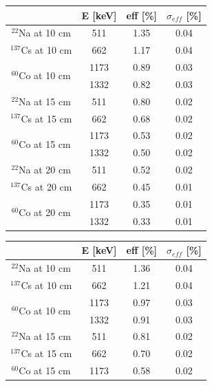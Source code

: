 \begin{table}[h]
    \begin{subtable}
        \centering
        \begin{tabular}{|c|c|c|c|}
        \hline
        & E [keV]  & eff [\%] &$\sigma_{eff}$ [\%]  \\
        \hline
        $^{22}$Na at 10 cm & 511 &1.35&0.04\\
        \hline
        $^{137}$Cs at 10 cm & 662 & 1.17 & 0.04\\
        \hline
        \multirow{2}{*}{$^{60}$Co at 10 cm}&1173 &0.89 & 0.03 \\ 
        &1332 &0.82 & 0.03 \\
        \hline
        $^{22}$Na at 15 cm & 511 &0.80&0.02\\
        \hline
        $^{137}$Cs at 15 cm & 662 & 0.68 & 0.02\\
        \hline
        \multirow{2}{*}{$^{60}$Co at 15 cm}&1173 &0.53 & 0.02 \\ 
        &1332 &0.50 & 0.02 \\
        \hline
        $^{22}$Na at 20 cm & 511 &0.52&0.02\\
        \hline
        $^{137}$Cs at 20 cm & 662 & 0.45 & 0.01\\
        \hline
        \multirow{2}{*}{$^{60}$Co at 20 cm}&1173 &0.35 & 0.01 \\
        &1332 &0.33 & 0.01 \\
        \hline
        \end{tabular}
    \end{subtable}
    \qquad
    \qquad
    \qquad
    \begin{subtable}
        \centering
        \begin{tabular}{|c|c|c|c|}
        \hline
        & E [keV]  & eff [\%] &$\sigma_{eff}$ [\%]  \\
        \hline
        $^{22}$Na at 10 cm & 511 &1.36&0.04\\
        \hline
        $^{137}$Cs at 10 cm & 662 & 1.21 & 0.04\\
        \hline
        \multirow{2}{*}{$^{60}$Co at 10 cm}&1173 &0.97 & 0.03 \\ 
        &1332 &0.91 & 0.03 \\
        \hline
        $^{22}$Na at 15 cm & 511 &0.81&0.02\\
        \hline
        $^{137}$Cs at 15 cm & 662 &0.70 & 0.02\\
        \hline
        \multirow{2}{*}{$^{60}$Co at 15 cm}&1173 &0.58 & 0.02 \\ 

\end{tabular}
\end{subtable}
\end{table}
